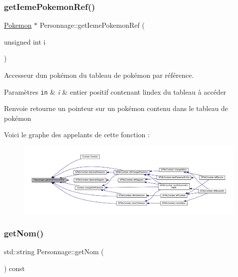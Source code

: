\subsubsection{\texorpdfstring{get\+Ieme\+Pokemon\+Ref()}{getIemePokemonRef()}}
{\footnotesize\ttfamily \hyperlink{class_pokemon}{Pokemon} $\ast$ Personnage\+::get\+Ieme\+Pokemon\+Ref (\begin{DoxyParamCaption}\item[{unsigned int}]{i }\end{DoxyParamCaption})}



Accesseur d\textquotesingle{}un pokémon du tableau de pokémon par référence. 


\begin{DoxyParams}[1]{Paramètres}
\mbox{\tt in}  & {\em i} & entier positif contenant l\textquotesingle{}index du tableau à accéder \\
\hline
\end{DoxyParams}
\begin{DoxyReturn}{Renvoie}
retourne un pointeur sur un pokémon contenu dans le tableau de pokémon 
\end{DoxyReturn}
Voici le graphe des appelants de cette fonction \+:\nopagebreak
\begin{figure}[H]
\begin{center}
\leavevmode
\includegraphics[width=350pt]{class_personnage_aeab0448ba1e833d57ee17827e3a6ac0d_icgraph}
\end{center}
\end{figure}
\mbox{\label{class_personnage_a411597dd00afced2f6eeb70461833dbe}} 
\subsubsection{\texorpdfstring{get\+Nom()}{getNom()}}
{\footnotesize\ttfamily std\+::string Personnage\+::get\+Nom (\begin{DoxyParamCaption}{ }\end{DoxyParamCaption}) const}




